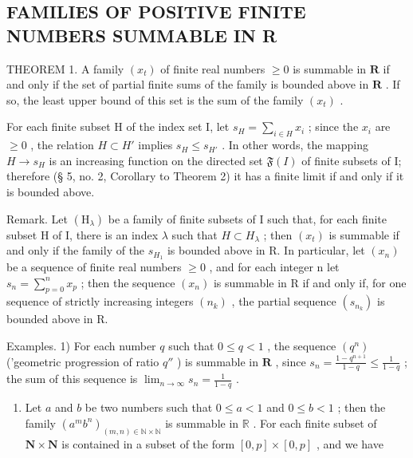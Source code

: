 \subsection{FAMILIES OF POSITIVE FINITE NUMBERS SUMMABLE IN R}

THEOREM 1. A family \((x_{t})\) of finite real numbers \(\geqslant 0\) is summable in \(\mathbf{R}\) if and only if the set of partial finite sums of the family is bounded above in \(\mathbf{R}\) . If so, the least upper bound of this set is the sum of the family \((x_{t})\) .

For each finite subset H of the index set I, let \(s_{H} = \sum_{i \in H} x_{i}\) ; since the \(x_{i}\) are \(\geqslant 0\) , the relation \(H \subset H'\) implies \(s_{H} \leqslant s_{H'}\) . In other words, the mapping \(H \to s_{H}\) is an increasing function on the directed set \(\mathfrak{F}(I)\) of finite subsets of I; therefore (§ 5, no. 2, Corollary to Theorem 2) it has a finite limit if and only if it is bounded above.

Remark. Let \((\mathrm{H}_{\lambda})\) be a family of finite subsets of I such that, for each finite subset H of I, there is an index \(\lambda\) such that \(H \subset H_{\lambda}\) ; then \((x_{t})\) is summable if and only if the family of the \(s_{H_{1}}\) is bounded above in R. In particular, let \((x_{n})\) be a sequence of finite real numbers \(\geqslant 0\) , and for each integer n let \(s_{n} = \sum_{p=0}^{n} x_{p}\) ; then the sequence \((x_{n})\) is summable in R if and only if, for one sequence of strictly increasing integers \((n_{k})\) , the partial sequence \((s_{n_{k}})\) is bounded above in R.

Examples. 1) For each number \(q\) such that \(0 \leqslant q < 1\) , the sequence \((q^n)\) ('geometric progression of ratio \(q''\) ) is summable in \(\mathbf{R}\) , since \(s_n = \frac{1 - q^{n+1}}{1 - q} \leqslant \frac{1}{1 - q}\) ; the sum of this sequence is \(\lim_{n \to \infty} s_n = \frac{1}{1 - q}\) .

\begin{enumerate}
\def\labelenumi{\arabic{enumi})}
\setcounter{enumi}{1}
\tightlist
\item
  Let \(a\) and \(b\) be two numbers such that \(0 \leqslant a < 1\) and \(0 \leqslant b < 1\) ; then the family \((a^{m}b^{n})_{(m,n) \in \mathbb{N} \times \mathbb{N}}\) is summable in \(\mathbb{R}\) . For each finite subset of \(\mathbf{N} \times \mathbf{N}\) is contained in a subset of the form \([0, p] \times [0, p]\) , and we have
\end{enumerate}

